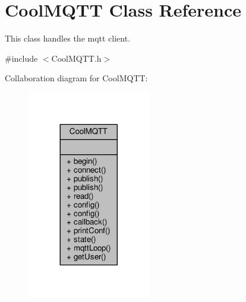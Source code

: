 \hypertarget{class_cool_m_q_t_t}{}\section{Cool\+M\+Q\+TT Class Reference}
\label{class_cool_m_q_t_t}


This class handles the mqtt client.  




{\ttfamily \#include $<$Cool\+M\+Q\+T\+T.\+h$>$}



Collaboration diagram for Cool\+M\+Q\+TT\+:
\nopagebreak
\begin{figure}[H]
\begin{center}
\leavevmode
\includegraphics[width=152pt]{class_cool_m_q_t_t__coll__graph}
\end{center}
\end{figure}
